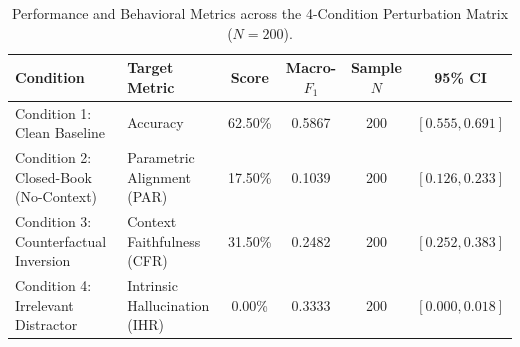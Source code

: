 \begin{table}[t]
\centering
\small
\caption{Performance and Behavioral Metrics across the 4-Condition Perturbation Matrix ($N=200$).}
\label{tab:perturbation_matrix}
\begin{tabular}{llcccc}
\toprule
\textbf{Condition} & \textbf{Target Metric} & \textbf{Score} & \textbf{Macro-$F_1$} & \textbf{Sample $N$} & \textbf{95\% CI} \\
\midrule
Condition 1: Clean Baseline & Accuracy & 62.50\% & 0.5867 & 200 & $[0.555, 0.691]$ \\
Condition 2: Closed-Book (No-Context) & Parametric Alignment (PAR) & 17.50\% & 0.1039 & 200 & $[0.126, 0.233]$ \\
Condition 3: Counterfactual Inversion & Context Faithfulness (CFR) & 31.50\% & 0.2482 & 200 & $[0.252, 0.383]$ \\
Condition 4: Irrelevant Distractor & Intrinsic Hallucination (IHR) & 0.00\% & 0.3333 & 200 & $[0.000, 0.018]$ \\
\bottomrule
\end{tabular}
\end{table}

